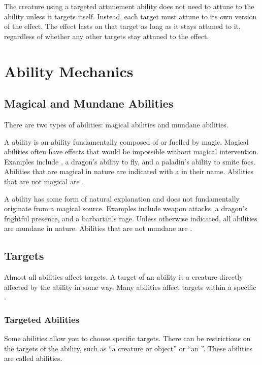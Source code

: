         The creature using a targeted attunement ability does not need to attune to the ability unless it targets itself.
        Instead, each target must attune to its own version of the effect.
        The effect lasts on that target as long as it stays attuned to it, regardless of whether any other targets stay attuned to the effect.

\section{Ability Mechanics}\label{Ability Mechanics}

    \subsection{Magical and Mundane Abilities}\label{Magical and Mundane Abilities}

        There are two types of abilities: magical abilities and mundane abilities.

        \label{Magical Abilities} A \magical ability is an ability fundamentally composed of or fuelled by magic.
        Magical abilities often have effects that would be impossible without magical intervention.
        Examples include , a dragon's ability to fly, and a paladin's ability to smite foes.
        Abilities that are magical in nature are indicated with a \sparkle in their name.
        Abilities that are not magical are .

        \label{Mundane Abilities} A  ability has some form of natural explanation and does not fundamentally originate from a magical source.
        Examples include weapon attacks, a dragon's frightful presence, and a barbarian's rage.
        Unless otherwise indicated, all abilities are mundane in nature.
        Abilities that are not mundane are \magical.

    \subsection{Targets}\label{Targets}
        Almost all abilities affect targets.
        A target of an ability is a creature directly affected by the ability in some way.
        Many abilities affect targets within a specific .

        \subsubsection{Targeted Abilities}\label{Targeted Abilities}
            Some abilities allow you to choose specific targets.
            There can be restrictions on the targets of the ability, such as ``a creature or object'' or ``an ''.
            These abilities are called  abilities.

